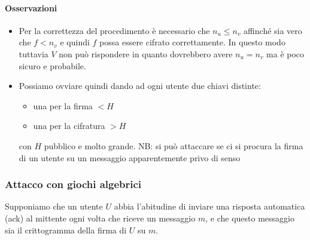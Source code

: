 \paragraph{Osservazioni} 
\begin{itemize}
	\item Per la correttezza del procedimento è necessario che $n_u \leq n_v$ affinché sia vero che $f < n_v$ e quindi $f$ possa essere cifrato correttamente.
	In questo modo tuttavia $V$ non può rispondere in quanto dovrebbero avere $n_u = n_v$ ma è poco sicuro e probabile.
	\item Possiamo ovviare quindi dando ad ogni utente due chiavi distinte: \begin{itemize}
		\item una per la firma $< H$ 
		\item una per la cifratura $> H$
	\end{itemize}  con $H$ pubblico e molto grande.
	NB: si può attaccare se ci si procura la firma di un utente su un messaggio apparentemente privo di senso
\end{itemize}


\subsubsection{Attacco con giochi algebrici}
Supponiamo che un utente $U$ abbia l'abitudine di inviare una risposta automatica (ack) al mittente ogni volta che riceve un messaggio $m$, e che questo messaggio sia il crittogramma della firma di $U$ su $m$.
